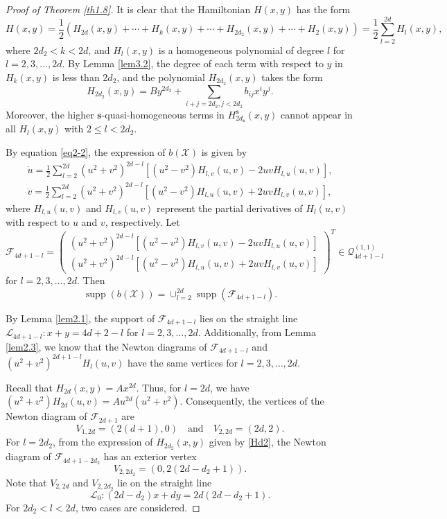 \documentclass[10pt,a4paper]{amsart}
\numberwithin{equation}{section}
\begin{document}
\begin{proof}[Proof of Theorem \ref{th1.8}]
It is clear that the Hamiltonian $H(x,y)$ has the  form
\[ %
 H(x,y)= \frac{1}{2}\left(H_{2d}(x,y)+\cdots+H_{k}(x,y)+\cdots
 +H_{2d_2}(x,y)+\cdots+H_{2}(x,y)\right)
= \frac{1}{2}\sum_{l=2}^{2d}H_l(x,y),
\]
where $2d_2<k<2d$, and $H_l(x,y)$ is a homogeneous polynomial of degree $l$ for
$l=2,3,\dots,2d$. By Lemma \ref{lem3.2}, the degree of each term with respect to $y$ 
in $H_k(x,y)$ is less than $2d_2$, and the polynomial $H_{2 d_2}(x,y)$ takes the form
\begin{equation}\label{Hd2}
H_{2d_2}(x,y)=By^{2d_2}+\sum_{i+j=2d_2, j<2d_2}b_{ij}x^{i}y^{j}.
\end{equation}
Moreover, the higher $\mathbf{s}$-quasi-homogeneous terms in 
$H^{\mathbf{s}}_{2d_{\mathbf{s}}}(x,y)$ cannot appear in all $H_l(x,y)$ with 
$2\leq l<2d_2$.

By equation \eqref{eq2-2}, the expression of $b(\mathcal{X})$ is given by
\begin{equation}\label{eq3-5}
\begin{gathered}
\dot u  = \frac{1}{2}\sum_{l=2}^{2d}(u^{2}+v^{2})^{2d-l}[(u^{2}-v^{2})H_{l,v}(u,v)-2uvH_{l,u}(u,v)], \\
\dot v  = \frac{1}{2}\sum_{l=2}^{2d}(u^{2}+v^{2})^{2d-l}[(u^{2}-v^{2})H_{l,u}(u,v)+2uvH_{l,v}(u,v)],
\end{gathered}
\end{equation}
where $H_{l,u}(u,v)$ and $H_{l,v}(u,v)$ represent the partial derivatives of 
$H_l(u,v)$ with respect to $u$ and $v$, respectively. Let
\begin{equation}\label{eq3-6}
\mathcal{F}_{4d+1-l}
=\begin{pmatrix}
 (u^{2}+v^{2})^{2d-l}[(u^{2}-v^{2})H_{l,v}(u,v)-2uvH_{l,u}(u,v)] \\
 (u^{2}+v^{2})^{2d-l}[(u^{2}-v^{2})H_{l,u}(u,v)+2uvH_{l,v}(u,v)]
\end{pmatrix}^T\in \mathcal{Q}_{4d+1-l}^{(1,1)}
\end{equation}
for $l=2,3,\dots,2d$. Then
$$
\operatorname{supp}(b(\mathcal{X}))
=\cup_{l=2}^{2d}\operatorname{supp}(\mathcal{F}_{4d+1-l}).
$$

By Lemma \ref{lem2.1}, the support of $\mathcal{F}_{4d+1-l}$ lies on the straight 
line $\mathcal{L}_{4d+1-l}:x+y=4d+2-l$ for $l=2,3,\dots,2d$. Additionally, from 
Lemma \ref{lem2.3}, we know that  the Newton diagrams of $\mathcal{F}_{4d+1-l}$ 
and $(u^2+v^2)^{2d+1-l}H_{l}(u,v)$ have the same vertices for $l=2,3,\dots,2d$.

Recall that $H_{2d}(x,y)=Ax^{2d}$. Thus, for $l=2d$, we have 
$(u^2+v^2)H_{2d}(u,v)=Au^{2d}(u^2+v^2)$. Consequently, the vertices of the Newton 
diagram of $\mathcal{F}_{2d+1}$ are
\[
V_{1,2d}=(2(d+1),0)\quad \text{and} \quad V_{2,2d}=(2d,2).
\]
For $l=2d_2$, from the expression of $H_{2d_2}(x,y)$ given by \eqref{Hd2}, 
the Newton diagram of $\mathcal{F}_{4d+1-2d_2}$ has an exterior vertex
\[
V_{2,2d_2}=(0,2(2d-d_2+1)).
\]
Note that $V_{2,2d}$ and $V_{2,2d_2}$ lie on the straight line
\begin{equation}\label{l1}
\mathcal{L}_0:(2d-d_2)x+dy=2d(2d-d_2+1).
\end{equation}
For $2d_2<l<2d$, two cases are considered.


\end{proof}
\end{document}
